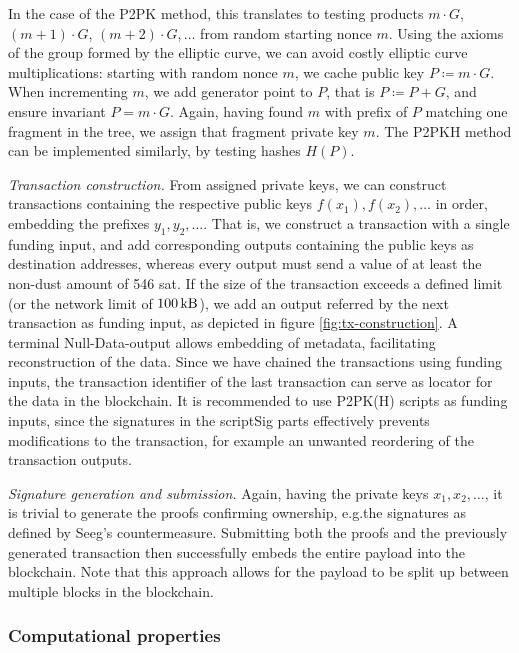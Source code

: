 \documentclass[a4paper,11pt,titlepage]{scrbook}
\begin{document}
In the case of the P2PK method, this translates to testing products $m\cdot G$, $(m{+}1)\cdot G$, $(m{+}2)\cdot G,\dots$ from random starting nonce $m$.
Using the axioms of the group formed by the elliptic curve, we can avoid costly elliptic curve multiplications: starting with random nonce $m$, we cache public key $P\coloneqq m\cdot G$.
When incrementing $m$, we add generator point to $P$, that is $P\coloneqq P+G$, and ensure invariant $P= m\cdot G$.
Again, having found $m$ with prefix of $P$ matching one fragment in the tree, we assign that fragment private key $m$.
The P2PKH method can be implemented similarly, by testing hashes $H(P)$.

\emph{Transaction construction.}
From assigned private keys, we can construct transactions containing the respective public keys $f(x_1), f(x_2), \dots$ in order, embedding the prefixes $y_1, y_2, \dots$.
That is, we construct a transaction with a single funding input, and add corresponding outputs containing the public keys as destination addresses, whereas every output must send a value of at least the non-dust amount of 546 sat.
If the size of the transaction exceeds a defined limit (or the network limit of $\SI{100}{\kilo\byte}$), we add an output referred by the next transaction as funding input, as depicted in figure \ref{fig:tx-construction}.
A terminal Null-Data-output allows embedding of metadata, facilitating reconstruction of the data.
Since we have chained the transactions using funding inputs, the transaction identifier of the last transaction can serve as locator for the data in the blockchain.
It is recommended to use P2PK(H) scripts as funding inputs, since the signatures in the scriptSig parts effectively prevents modifications to the transaction, for example an unwanted reordering of the transaction outputs.

\emph{Signature generation and submission.}
Again, having the private keys $x_1, x_2, \dots$, it is trivial to generate the proofs confirming ownership, e.g.\@ the signatures as defined by Seeg's countermeasure.
Submitting both the proofs and the previously generated transaction then successfully embeds the entire payload into the blockchain.
Note that this approach allows for the payload to be split up between multiple blocks in the blockchain.

\subsubsection*{Computational properties}
\end{document}
